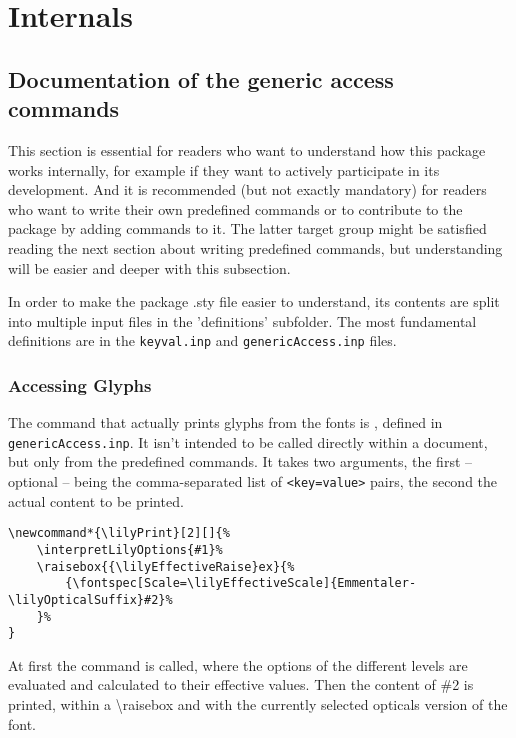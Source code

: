 \documentclass{article}
\begin{document}
\section{Internals}
\label{sec:internals}

\subsection{Documentation of the generic access commands}
\label{subsec:internals_generic_access}
This section is essential for readers who want to understand how this package works internally, for example if they want to actively participate in its development.
And it is recommended (but not exactly mandatory) for readers who want to write their own predefined commands or to contribute to the package by adding commands to it. 
The latter target group might be satisfied reading the next section about writing predefined commands, but understanding will be easier and deeper with this subsection.

\medskip
In order to make the package .sty file easier to understand, its contents are split into multiple input files in the 'definitions' subfolder. 
The most fundamental definitions are in the \texttt{keyval.inp} and \texttt{genericAccess.inp} files.

\subsubsection{Accessing \emmentaler Glyphs}
\label{subsubsec:accessing_emmentaler_glyphs}
The command that actually prints glyphs from the \emmentaler fonts is , defined in \texttt{genericAccess.inp}.
It isn't intended to be called directly within a document, but only from the predefined commands.
It takes two arguments, the first -- optional -- being the comma-separated list of \texttt{<key=value>} pairs, the second the actual content to be printed.

\begin{verbatim}
\newcommand*{\lilyPrint}[2][]{%
    \interpretLilyOptions{#1}%
    \raisebox{{\lilyEffectiveRaise}ex}{%
        {\fontspec[Scale=\lilyEffectiveScale]{Emmentaler-\lilyOpticalSuffix}#2}%
    }%
}
\end{verbatim}

At first the command  is called, where the options of the different levels are evaluated and calculated to their effective values.
Then the content of \#2 is printed, within a \textbackslash raisebox and with the currently selected opticals version of the \emmentaler font.
\end{document}
